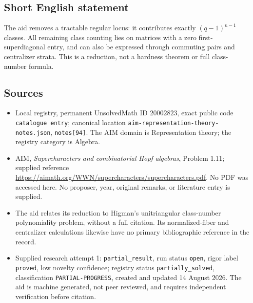 \documentclass[11pt]{article}
\begin{document}
\subsection{Short English statement}
The aid removes a tractable regular locus: it contributes exactly \((q-1)^{n-1}\) classes. All remaining class counting lies on matrices with a zero first-superdiagonal entry, and can also be expressed through commuting pairs and centralizer strata. This is a reduction, not a hardness theorem or full class-number formula.
\subsection{Sources}
\begin{itemize}
\item Local registry, permanent UnsolvedMath ID \(20002823\), exact public code \texttt{catalogue entry}; canonical location \texttt{aim-representation-theory-notes.json}, \texttt{notes[94]}. The AIM domain is Representation theory; the registry category is Algebra.
\item AIM, \emph{Supercharacters and combinatorial Hopf algebras}, Problem 1.11; supplied reference \url{https://aimath.org/WWN/supercharacters/supercharacters.pdf}. No PDF was accessed here. No proposer, year, original remarks, or literature entry is supplied.
\item The aid relates its reduction to Higman's unitriangular class-number polynomiality problem, without a full citation. Its normalized-fiber and centralizer calculations likewise have no primary bibliographic reference in the record.
\item Supplied research attempt 1: \texttt{partial\_result}, run status \texttt{open}, rigor label \texttt{proved}, low novelty confidence; registry status \texttt{partially\_solved}, classification \texttt{PARTIAL-PROGRESS}, created and updated 14 August 2026. The aid is machine generated, not peer reviewed, and requires independent verification before citation.
\end{itemize}
\end{document}
